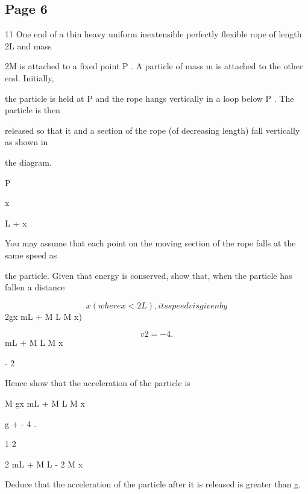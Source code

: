 \documentclass[12pt]{article}
\begin{document}
\subsection*{Page 6}
\begin{flushleft}
11 One end of a thin heavy uniform inextensible perfectly flexible rope of length 2L and mass\par
2M is attached to a fixed point P . A particle of mass m is attached to the other end. Initially,\par
the particle is held at P and the rope hangs vertically in a loop below P . The particle is then\par
released so that it and a section of the rope (of decreasing length) fall vertically as shown in\par
the diagram.\par
P\par
x\par
L + x\par
You may assume that each point on the moving section of the rope falls at the same speed as\par
the particle. Given that energy is conserved, show that, when the particle has fallen a distance\par
\[x (where x < 2L), its speed v is given by\]
2gx mL + M L M x)\par
\[v 2 = - 4 .\]
mL + M L M x\par
- 2\par
Hence show that the acceleration of the particle is\par
M gx mL + M L M x\par
g + - 4 .\par
1 2\par
2 mL + M L - 2 M x\par
Deduce that the acceleration of the particle after it is released is greater than g.\par
\end{flushleft}
\end{document}
